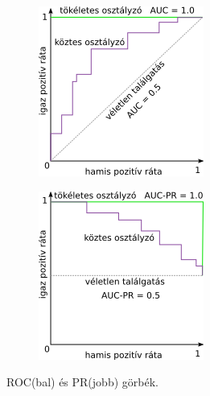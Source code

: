 \begin{figure}
    \centering
    \begin{subfigure}[b]{0.45\linewidth}
        \includegraphics[width=\linewidth]{figures/ROC.png}
        \label{fig:roc}
    \end{subfigure}
    \begin{subfigure}[b]{0.45\linewidth}
        \includegraphics[width=\linewidth]{figures/PR.png}
        \label{fig:pr}
    \end{subfigure}
    \caption{ROC(bal) és PR(jobb) görbék.}
    \label{fig:roc_and_pr_curves}
\end{figure}

